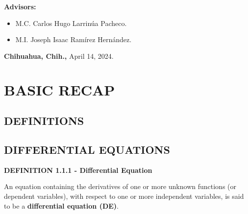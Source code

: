 \documentclass[12pt]{report}
\begin{document}
\begin{titlepage}
\begin{center}
			{\large \textbf{Advisors:}}\\[3.5ex]
			\begin{itemize}
				\item {\large M.C. Carlos Hugo Larrinúa Pacheco.}\\[3.5ex]
				\item {\large M.I. Joseph Isaac Ramírez Hernández.}\\[3.5ex]
			\end{itemize}
			\vfill
			{\large \textbf{Chihuahua, Chih.,} April 14, 2024.}\\[3.5ex]
		\end{center}
	\end{titlepage}

	\part*{BASIC RECAP}
	
	\chapter*{DEFINITIONS}


	
	\chapter{DIFFERENTIAL EQUATIONS}

        \par \textbf{DEFINITION 1.1.1 - Differential Equation}

        \par An equation containing the derivatives of one or more unknown functions (or dependent variables), with respect to one or more independent variables, is said to be a \textbf{differential equation (DE)}.
\end{document}
